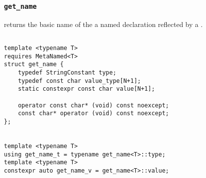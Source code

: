 
\subsubsection{\texttt{get\_name}}

returns the basic name of the a named declaration reflected by a .

\begin{verbatim}

template <typename T>
requires MetaNamed<T>
struct get_name {
	typedef StringConstant type;
	typedef const char value_type[N+1];
	static constexpr const char value[N+1];

	operator const char* (void) const noexcept;
	const char* operator (void) const noexcept;
};


template <typename T>
using get_name_t = typename get_name<T>::type;
template <typename T>
constexpr auto get_name_v = get_name<T>::value;

\end{verbatim}
